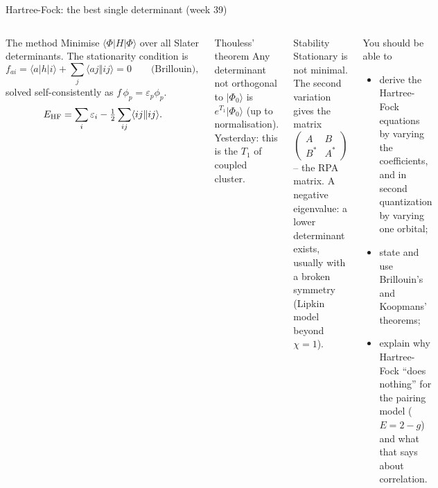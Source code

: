 \documentclass[aspectratio=169,10pt]{beamer}
\newcommand{\ket}[1]{\vert #1\rangle}
\newcommand{\mel}[3]{\langle #1\lvert #2\rvert #3\rangle}
\newcommand{\ph}{\Phi_0}
\newcommand{\as}[4]{\langle #1#2\Vert #3#4\rangle}
\begin{document}
\begin{frame}[shrink=7]{Hartree-Fock: the best single determinant (week 39)}
\small
\begin{columns}[T]
\begin{block}{The method}
Minimise $\mel{\Phi}{H}{\Phi}$ over all Slater determinants. The stationarity condition is
\[
 f_{ai}=\mel{a}{h}{i}+\sum_j\as ajij=0\qquad\text{(Brillouin)},
\]
solved self-consistently as $f\,\phi_p=\varepsilon_p\phi_p$.
\[
 E_{\rm HF}=\sum_i\varepsilon_i-\tfrac12\sum_{ij}\as ijij .
\]
\end{block}
\begin{block}{Thouless' theorem}
Any determinant not orthogonal to $\ket{\ph}$ is $e^{T_1}\ket{\ph}$ (up to normalisation). Yesterday: this is the $T_1$ of coupled cluster.
\end{block}
\begin{block}{Stability}
Stationary is not minimal. The second variation gives the matrix
$\begin{pmatrix}A&B\\B^*&A^*\end{pmatrix}$ -- the RPA matrix. A negative eigenvalue: a lower determinant exists, usually with a broken symmetry (Lipkin model beyond $\chi=1$).
\end{block}
\begin{block}{You should be able to}
\begin{itemize}
\item derive the Hartree-Fock equations by varying the coefficients, and in second quantization by varying one orbital;
\item state and use Brillouin's and Koopmans' theorems;
\item explain why Hartree-Fock ``does nothing'' for the pairing model ($E=2-g$) and what that says about correlation.
\end{itemize}
\end{block}
\end{columns}
\end{frame}
\end{document}
